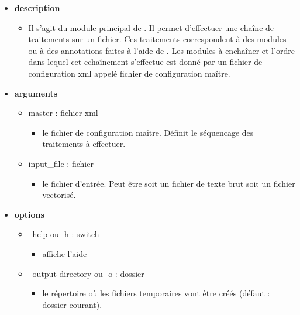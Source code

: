 \documentclass[manual-fr.tex]{subfiles}
\begin{document}
\begin{itemize}
    \item[] \textbf{description}
        \begin{itemize}
            \item[] Il s'agit du module principal de \SEM. Il permet d'effectuer une chaîne de traitements sur un fichier.
                Ces traitements correspondent à des modules ou à des annotations faites à l'aide de \Wapiti. Les modules à
                enchaîner et l'ordre dans lequel cet echaînement s'effectue est donné par un fichier de configuration xml
                appelé fichier de configuration maître.
        \end{itemize}
    \item[] \textbf{arguments}
        \begin{itemize}
            \item[] master : fichier xml
                \begin{itemize}
                    \item[] le fichier de configuration maître. Définit le séquencage des traitements à effectuer.
                \end{itemize}
            \item[] input\_file : fichier
                \begin{itemize}
                    \item[] le fichier d'entrée. Peut être soit un fichier de texte brut soit un fichier vectorisé.
                \end{itemize}
        \end{itemize}
    \item[] \textbf{options}
        \begin{itemize}
            \item[] --help ou -h : switch
                \begin{itemize}
                    \item[] affiche l'aide
                \end{itemize}
            \item[] --output-directory ou -o : dossier
                \begin{itemize}
                    \item[] le répertoire où les fichiers temporaires vont être créés (défaut : dossier courant).
                \end{itemize}
        \end{itemize}
\end{itemize}
\end{document}
